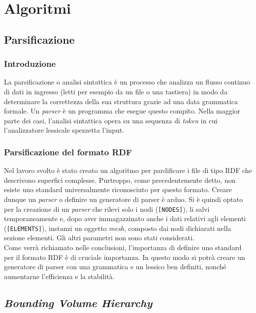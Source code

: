 \chapter{Algoritmi}
\label{Geom_Algos}
%
\section{Parsificazione}
%
\subsection{Introduzione}
La parsificazione o analisi sintattica è un processo che analizza un flusso continuo di dati in ingresso (letti per esempio da un file o una tastiera) in modo da determinare la correttezza della sua struttura grazie ad una data grammatica formale. Un \textit{parser} è un programma che esegue questo compito. Nella maggior parte dei casi, l'analisi sintattica opera su una sequenza di \textit{token} in cui l'analizzatore lessicale spezzetta l'input.
%
\subsection{Parsificazione del formato RDF}
Nel lavoro svolto è stato creato un algoritmo per pardificare i file di tipo \ac{RDF} che descrivono superfici complesse. Purtroppo, come precedentemente detto, non esiste uno standard universalmente riconosciuto per questo formato. Creare dunque un \textit{parser} o definire un generatore di parser è arduo. Si è quindi optato per la creazione di un \textit{parser} che rilevi solo i nodi (\texttt{[NODES]}), li salvi temporaneamente e, dopo aver immagazzinato anche i dati relativi agli elementi (\texttt{[ELEMENTS]}), instanzi un oggetto \textit{mesh}, composto dai nodi dichiarati nella sezione elementi. Gli altri parametri non sono stati considerati.\\

Come verrà richiamato nelle conclusioni, l'importanza di definire uno standard per il formato \ac{RDF} è di cruciale importanza. In questo modo si potrà creare un generatore di parser con una grammatica e un lessico ben definiti, nonché aumentarne l'efficienza e la stabilità.
%
%
\section{\textit{Bounding Volume Hierarchy}}
%
